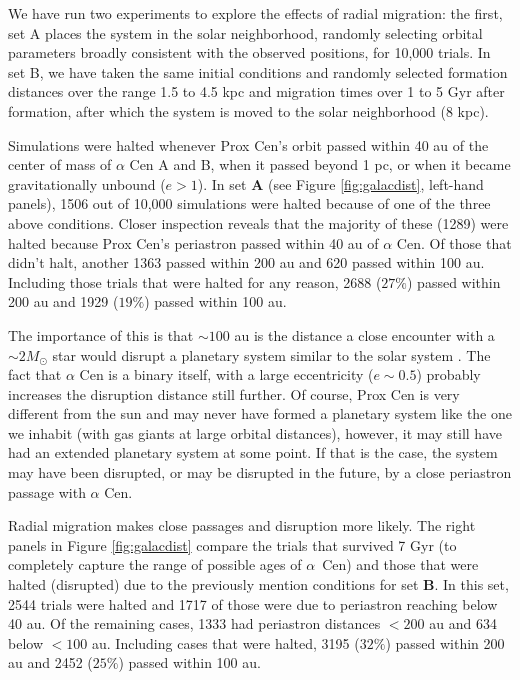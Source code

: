 \documentclass[preprint,12pt]{aastex}
\def\acen{{$\alpha$~Cen}}
\begin{document}
We have run two experiments to explore the effects of radial migration: the first, 
set A places the system in the solar neighborhood, randomly selecting 
orbital parameters broadly consistent with the observed positions, for 10,000 
trials. In set B, we have taken the same initial conditions and randomly 
selected formation distances over the range 1.5 to 4.5 kpc and migration times
over 1 to 5 Gyr after formation, after which the system is moved to the solar 
neighborhood (8 kpc). 

Simulations were halted whenever Prox Cen's orbit passed within 40 au of 
the center of mass of $\alpha$ Cen A and B, when it passed beyond 1 pc,
or when it became gravitationally unbound ($e > 1$). In set \textbf{A} 
(see Figure \ref{fig:galacdist}, left-hand panels), 1506 
out of 10,000 simulations were halted because of one of the three above conditions.
Closer inspection reveals that the majority of these (1289) were halted because 
Prox Cen's periastron passed within 40 au of $\alpha$ Cen. Of those that didn't
halt, another 1363 passed within 200 au and 620 passed within 100 au. Including 
those trials that were halted for any reason, 2688 ($27\%$) passed within 200 au and
1929 ($19\%$) passed within 100 au. 

The importance of this is that $\sim 100$ au is the distance a close encounter with a 
$\sim 2 M_{\odot}$ star would disrupt a planetary system similar to the solar system
\citep{Kaib13}. The fact that $\alpha$ Cen is a binary itself, with a large eccentricity 
($e \sim 0.5$) probably increases the disruption distance still further.
Of course, Prox Cen is very different from the sun and may never 
have formed a planetary system like the one we inhabit (with gas giants at large 
orbital distances), however, it may still have had an extended planetary system
at some point. If that is the case, the system may have been disrupted, or may be
disrupted in the future, by a close periastron passage with $\alpha$ Cen.

Radial migration makes close passages and disruption more likely. The right 
panels in Figure \ref{fig:galacdist} compare the trials that survived 7 Gyr (to completely 
capture the range of possible ages of \acen)
and those that were halted (disrupted) due to the previously mention conditions 
for set \textbf{B}. In this set, 2544 trials were halted and 1717 of those were 
due to periastron reaching below 40 au. Of the remaining cases, 1333 had 
periastron distances $< 200$ au and 634 below $<100$ au. Including
cases that were halted, 3195 ($32\%$) passed within 200 au and 2452 ($25\%$) 
passed within 100 au.
\end{document}
